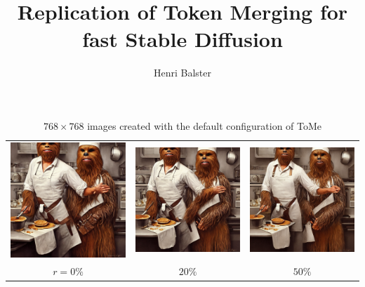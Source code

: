 \documentclass[12pt,a4paper]{article}
\title{Replication of Token Merging for fast Stable Diffusion}
\author{Henri Balster}
\date{}
\begin{document}

\newpage
\tableofcontents
\onehalfspacing
\newpage
{}

\begin{table}[!htb]
\centering
\begin{tabular}{c c c}
    \includegraphics[width=0.3\linewidth]{static/sample_imgs/main/wookie_0.png} & \includegraphics[width=0.3\linewidth]{static/sample_imgs/main/wookie_20.png} &
    \includegraphics[width=0.3\linewidth]{static/sample_imgs/main/wookie_50.png}\\
    \(r=0\%\) & \(20\%\) & \(50\%\) \\
\end{tabular}
\caption{$768 \times 768$ images created with the default configuration of ToMe}
\end{table}









\newpage



\end{document}
